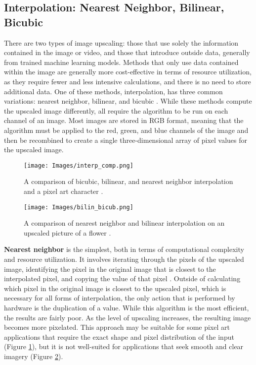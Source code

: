\documentclass{article}
\begin{document}
    \subsection{Interpolation: Nearest Neighbor, Bilinear, Bicubic}
    \noindent There are two types of image upscaling: those that use solely the information contained in the image or video, and those that introduce outside data, generally from trained machine learning models. Methods that only use data contained within the image are generally more cost-effective in terms of resource utilization, as they require fewer and less intensive calculations, and there is no need to store additional data. One of these methods, interpolation, has three common variations: nearest neighbor, bilinear, and bicubic \cite{fadnavis_image_2014}. While these methods compute the upscaled image differently, all require the algorithm to be run on each channel of an image. Most images are stored in RGB format, meaning that the algorithm must be applied to the red, green, and blue channels of the image and then be recombined to create a single three-dimensional array of pixel values for the upscaled image. 
    \begin{figure}[!tb] 
        \centering
        \texttt{[image: Images/interp\_comp.png]} 
        \caption{A comparison of bicubic, bilinear, and nearest neighbor interpolation and a pixel art character \cite{taranvh_nearest_2023}.} 
        \label{fig:pixart_interp} 
    \end{figure}
    \begin{figure}[!tb] 
        \centering
        \texttt{[image: Images/bilin\_bicub.png]} 
        \caption{A comparison of nearest neighbor and bilinear interpolation on an upscaled picture of a flower \cite{noauthor_zoom_2012}.} 
        \label{fig:interp_flower} 
    \end{figure}
    \par \textbf{Nearest neighbor} is the simplest, both in terms of computational complexity and resource utilization. It involves iterating through the pixels of the upscaled image, identifying the pixel in the original image that is closest to the interpolated pixel, and copying the value of that pixel \cite{patel_review_2013}. Outside of calculating which pixel in the original image is closest to the upscaled pixel, which is necessary for all forms of interpolation, the only action that is performed by hardware is the duplication of a value. While this algorithm is the most efficient, the results are fairly poor. As the level of upscaling increases, the resulting image becomes more pixelated. This approach may be suitable for some pixel art applications that require the exact shape and pixel distribution of the input (Figure \ref{fig:pixart_interp}), but it is not well-suited for applications that seek smooth and clear imagery (Figure \ref{fig:interp_flower}).  
\end{document}
